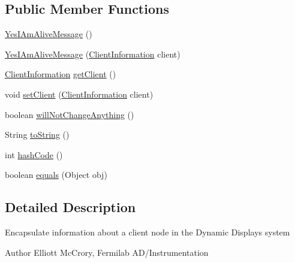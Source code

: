 \subsection*{Public Member Functions}
\begin{DoxyCompactItemize}
\item 
\hyperlink{classgov_1_1fnal_1_1ppd_1_1dd_1_1xml_1_1messages_1_1YesIAmAliveMessage_acd1c7ab750b494438b4b5b356bd26c6f}{Yes\-I\-Am\-Alive\-Message} ()
\item 
\hyperlink{classgov_1_1fnal_1_1ppd_1_1dd_1_1xml_1_1messages_1_1YesIAmAliveMessage_a4acc53e888b2811d12084c51be7f86cd}{Yes\-I\-Am\-Alive\-Message} (\hyperlink{classgov_1_1fnal_1_1ppd_1_1dd_1_1xml_1_1ClientInformation}{Client\-Information} client)
\item 
\hyperlink{classgov_1_1fnal_1_1ppd_1_1dd_1_1xml_1_1ClientInformation}{Client\-Information} \hyperlink{classgov_1_1fnal_1_1ppd_1_1dd_1_1xml_1_1messages_1_1YesIAmAliveMessage_aafc83ea0c391f9665d73ef6d1bcbea50}{get\-Client} ()
\item 
void \hyperlink{classgov_1_1fnal_1_1ppd_1_1dd_1_1xml_1_1messages_1_1YesIAmAliveMessage_ab51a53df10ec5d67e22438c24c7c0457}{set\-Client} (\hyperlink{classgov_1_1fnal_1_1ppd_1_1dd_1_1xml_1_1ClientInformation}{Client\-Information} client)
\item 
boolean \hyperlink{classgov_1_1fnal_1_1ppd_1_1dd_1_1xml_1_1messages_1_1YesIAmAliveMessage_a6996a1e0edef1c8aacd9188cae1ba883}{will\-Not\-Change\-Anything} ()
\item 
String \hyperlink{classgov_1_1fnal_1_1ppd_1_1dd_1_1xml_1_1messages_1_1YesIAmAliveMessage_a5ac5cd0b0875b1d8f9cee5d5354c1aed}{to\-String} ()
\item 
int \hyperlink{classgov_1_1fnal_1_1ppd_1_1dd_1_1xml_1_1messages_1_1YesIAmAliveMessage_abe4ba87f5b6d8a764179fafa09f8f39f}{hash\-Code} ()
\item 
boolean \hyperlink{classgov_1_1fnal_1_1ppd_1_1dd_1_1xml_1_1messages_1_1YesIAmAliveMessage_ab18642e1550a6044e5ba2d7b3f4cef7a}{equals} (Object obj)
\end{DoxyCompactItemize}


\subsection{Detailed Description}
Encapsulate information about a client node in the Dynamic Displays system

\begin{DoxyAuthor}{Author}
Elliott Mc\-Crory, Fermilab A\-D/\-Instrumentation 
\end{DoxyAuthor}


